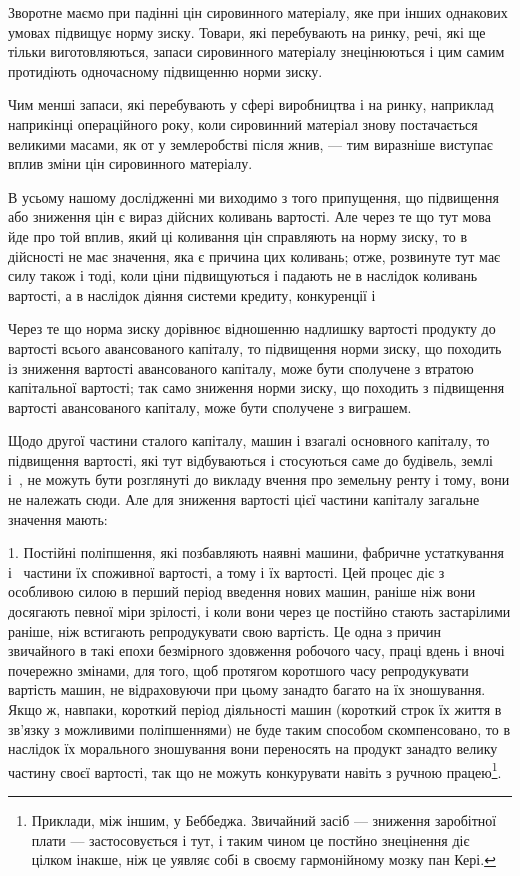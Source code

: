 Зворотне маємо при падінні цін сировинного матеріалу, яке
при інших однакових умовах підвищує норму зиску. Товари, які
перебувають на ринку, речі, які ще тільки виготовляються,
запаси сировинного матеріалу знецінюються і цим самим протидіють
одночасному підвищенню норми зиску.

Чим менші запаси, які перебувають у сфері виробництва
і на ринку, наприклад наприкінці операційного року, коли сировинний
матеріал знову постачається великими масами, як от у землеробстві після жнив, — тим
виразніше виступає вплив зміни цін сировинного матеріалу.

В усьому нашому дослідженні ми виходимо з того припущення, що підвищення або зниження цін є вираз
дійсних коливань вартості. Але через те що тут мова йде про той вплив, який ці коливання цін
справляють на норму зиску, то в дійсності не має значення, яка є причина цих коливань; отже,
розвинуте тут має силу також і тоді, коли ціни підвищуються і падають не в наслідок коливань
вартості, а в наслідок діяння системи кредиту, конкуренції і~

Через те що норма зиску дорівнює відношенню надлишку вартості продукту до вартості всього
авансованого капіталу, то підвищення норми зиску, що походить із зниження вартості авансованого
капіталу, може бути сполучене з втратою капітальної вартості; так само зниження норми зиску, що
походить з підвищення вартості авансованого капіталу, може бути сполучене з виграшем.

Щодо другої частини сталого капіталу, машин і взагалі основного капіталу, то підвищення вартості,
які тут відбуваються і стосуються саме до будівель, землі і~, не можуть бути розглянуті до
викладу вчення про земельну ренту і тому, вони не належать сюди. Але для зниження вартості цієї
частини капіталу загальне значення мають:

1. Постійні поліпшення, які позбавляють наявні машини, фабричне устаткування і~ частини їх
споживної вартості,
а тому і їх вартості. Цей процес діє з особливою силою в перший період введення нових машин, раніше
ніж вони досягають певної міри зрілості, і коли вони через це постійно стають застарілими раніше,
ніж встигають репродукувати свою вартість. Це одна з причин звичайного в такі епохи безмірного
здовження робочого часу, праці вдень і вночі почережно змінами, для того, щоб протягом коротшого
часу репродукувати вартість машин, не відраховуючи при цьому занадто багато на їх зношування. Якщо
ж, навпаки, короткий період діяльності
машин (короткий строк їх життя в зв’язку з можливими поліпшеннями) не буде таким способом
скомпенсовано, то в наслідок їх морального зношування вони переносять на продукт занадто велику
частину своєї вартості, так що не можуть конкурувати навіть з ручною працею\footnote{Приклади, між іншим,
у Беббеджа. Звичайний засіб — зниження заробітної плати — застосовується і тут, і таким чином це постйно
знецінення діє цілком інакше, ніж це уявляє собі в своєму гармонійному мозку пан Кері.
}.

